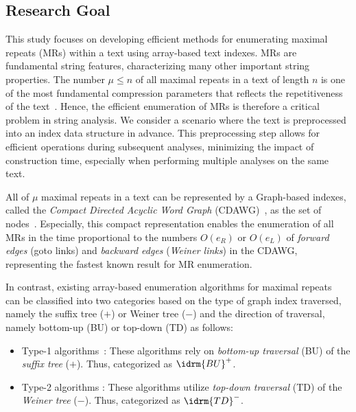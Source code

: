 \subsection{Research Goal}

This study focuses on developing efficient methods for enumerating maximal repeats (MRs) within a text using array-based text indexes. MRs are fundamental string features, characterizing many other important string properties. The number $\mu\le n$ of all maximal repeats in a text of length $n$ is one of the most fundamental compression parameters that reflects the repetitiveness of the text~\cite{navarro2021indexing:i}. 
Hence, the efficient enumeration of MRs is therefore a critical problem in string analysis. We consider a scenario where the text is preprocessed into an index data structure in advance. This preprocessing step allows for efficient operations during subsequent analyses, minimizing the impact of construction time, especially when performing multiple analyses on the same text.

All of $\mu$ maximal repeats in a text can be represented by a Graph-based indexes, called the \textit{Compact Directed Acyclic Word Graph} (CDAWG)~\cite{blumer1987complete}, as the set of nodes~\cite{raffinot2001maximal}. 
Especially, this compact representation enables the enumeration of all MRs in the time proportional to the numbers $O(e_R)$ or $O(e_L)$ of \textit{forward edges} (goto links) and \textit{backward edges} (\textit{Weiner links}) in the CDAWG, representing the fastest known result for MR enumeration.  

In contrast, existing array-based enumeration algorithms for maximal repeats~\cite{narisawa2007efficient,okanohara2009linear,beller:berger2012space:efficient:bbo,belazzougui2020linear,nishimoto:cpm2021enum} can be classified into two categories based on the type of graph index traversed, namely the suffix tree ($+$) or Weiner tree ($-$) and the direction of traversal, namely bottom-up (BU) or top-down (TD) as follows:
\begin{itemize}
\item Type-1 algorithms~\cite{narisawa2007efficient,okanohara2009linear}: These algorithms rely on \textit{bottom-up traversal} (BU) of the \textit{suffix tree} ($+$). Thus, categorized as $\idrm{BU}^+$. 
\item Type-2 algorithms \cite{beller:berger2012space:efficient:bbo,belazzougui2020linear,nishimoto:cpm2021enum}: These algorithms utilize \textit{top-down traversal} (TD) of the \textit{Weiner tree} ($-$). Thus, categorized as $\idrm{TD}^-$. 
\end{itemize}

